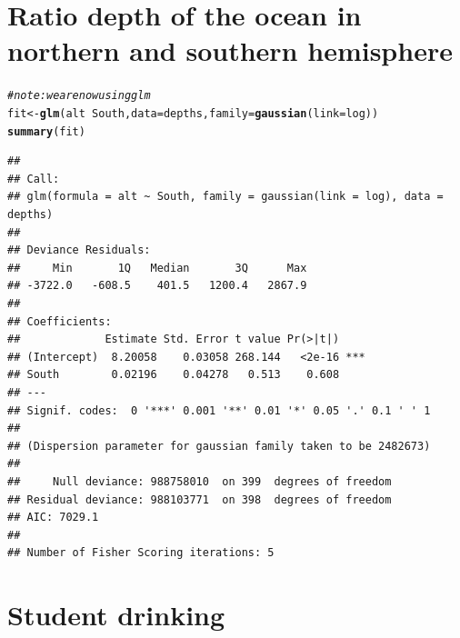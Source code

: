 \documentclass[landscape,twocolumn,letterpaper,9pt,reqno]{article}\usepackage[]{graphicx}\usepackage[]{color}
\newcommand{\hlcom}[1]{\textcolor[rgb]{0.678,0.584,0.686}{\textit{#1}}}%
\newcommand{\hlopt}[1]{\textcolor[rgb]{0,0,0}{#1}}%
\newcommand{\hlstd}[1]{\textcolor[rgb]{0.345,0.345,0.345}{#1}}%
\newcommand{\hlkwb}[1]{\textcolor[rgb]{0.69,0.353,0.396}{#1}}%
\newcommand{\hlkwc}[1]{\textcolor[rgb]{0.333,0.667,0.333}{#1}}%
\newcommand{\hlkwd}[1]{\textcolor[rgb]{0.737,0.353,0.396}{\textbf{#1}}}%
\newenvironment{knitrout}{}{} %
\begin{document}
\clearpage

\section{Ratio depth of the ocean in northern and southern hemisphere}

\begin{knitrout}
\color{fgcolor}
\begin{alltt}
\hlcom{# note: we are now using glm}
\hlstd{fit} \hlkwb{<-} \hlkwd{glm}\hlstd{(alt} \hlopt{~} \hlstd{South,} \hlkwc{data} \hlstd{= depths,} \hlkwc{family} \hlstd{=} \hlkwd{gaussian}\hlstd{(}\hlkwc{link}\hlstd{=log))}
\hlkwd{summary}\hlstd{(fit)}
\end{alltt}
\begin{verbatim}
## 
## Call:
## glm(formula = alt ~ South, family = gaussian(link = log), data = depths)
## 
## Deviance Residuals: 
##     Min       1Q   Median       3Q      Max  
## -3722.0   -608.5    401.5   1200.4   2867.9  
## 
## Coefficients:
##             Estimate Std. Error t value Pr(>|t|)    
## (Intercept)  8.20058    0.03058 268.144   <2e-16 ***
## South        0.02196    0.04278   0.513    0.608    
## ---
## Signif. codes:  0 '***' 0.001 '**' 0.01 '*' 0.05 '.' 0.1 ' ' 1
## 
## (Dispersion parameter for gaussian family taken to be 2482673)
## 
##     Null deviance: 988758010  on 399  degrees of freedom
## Residual deviance: 988103771  on 398  degrees of freedom
## AIC: 7029.1
## 
## Number of Fisher Scoring iterations: 5
\end{verbatim}

\end{knitrout}


\clearpage


\section{Student drinking}
\end{document}
